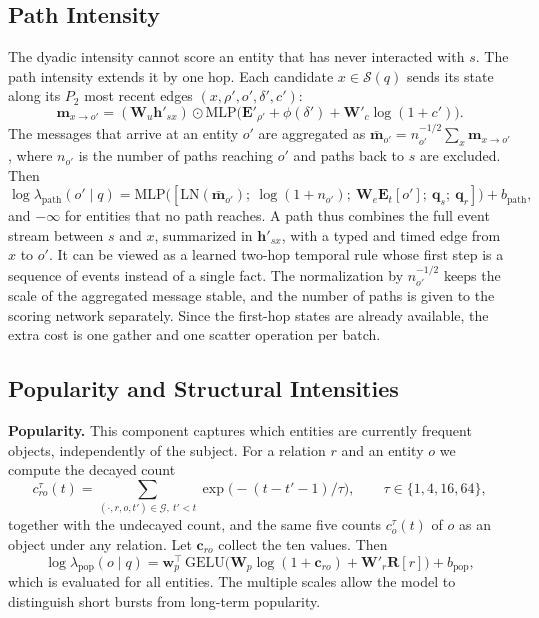 \documentclass[runningheads]{llncs}
\newcommand{\lam}{\lambda}
\newcommand{\para}[1]{\smallskip\noindent\textbf{#1}}
\begin{document}
\subsection{Path Intensity}
\label{sec:path}

The dyadic intensity cannot score an entity that has never interacted with $s$. The path intensity extends it by one hop. Each candidate $x \in \mathcal{S}(q)$ sends its state along its $P_2$ most recent edges $(x, \rho', o', \delta', c')$:
\begin{equation}
  \mathbf{m}_{x \to o'} = (\mathbf{W}_u \mathbf{h}'_{sx}) \odot \mathrm{MLP}\big(\mathbf{E}'_{\rho'} + \phi(\delta') + \mathbf{W}'_c \log(1+c')\big).
\end{equation}
The messages that arrive at an entity $o'$ are aggregated as $\bar{\mathbf{m}}_{o'} = n_{o'}^{-1/2} \sum_x \mathbf{m}_{x \to o'}$, where $n_{o'}$ is the number of paths reaching $o'$ and paths back to $s$ are excluded. Then
\begin{equation}
  \log\lam_{\mathrm{path}}(o' \mid q) = \mathrm{MLP}\big([\mathrm{LN}(\bar{\mathbf{m}}_{o'});\ \log(1+n_{o'});\ \mathbf{W}_e \mathbf{E}_t[o'];\ \mathbf{q}_s;\ \mathbf{q}_r]\big) + b_{\mathrm{path}},
\end{equation}
and $-\infty$ for entities that no path reaches. A path thus combines the full event stream between $s$ and $x$, summarized in $\mathbf{h}'_{sx}$, with a typed and timed edge from $x$ to $o'$. It can be viewed as a learned two-hop temporal rule whose first step is a sequence of events instead of a single fact. The normalization by $n_{o'}^{-1/2}$ keeps the scale of the aggregated message stable, and the number of paths is given to the scoring network separately. Since the first-hop states are already available, the extra cost is one gather and one scatter operation per batch.

\subsection{Popularity and Structural Intensities}
\label{sec:struct}

\para{Popularity.} This component captures which entities are currently frequent objects, independently of the subject. For a relation $r$ and an entity $o$ we compute the decayed count
\begin{equation}
  c^{\tau}_{ro}(t) = \sum_{(\cdot, r, o, t') \in \mathcal{G},\ t' < t} \exp\!\big(-(t - t' - 1)/\tau\big), \qquad \tau \in \{1, 4, 16, 64\},
\end{equation}
together with the undecayed count, and the same five counts $c^{\tau}_{o}(t)$ of $o$ as an object under any relation. Let $\mathbf{c}_{ro}$ collect the ten values. Then
\begin{equation}
  \log\lam_{\mathrm{pop}}(o \mid q) = \mathbf{w}_p^\top\, \mathrm{GELU}\big(\mathbf{W}_p \log(1 + \mathbf{c}_{ro}) + \mathbf{W}'_r \mathbf{R}[r]\big) + b_{\mathrm{pop}} ,
\end{equation}
which is evaluated for all entities. The multiple scales allow the model to distinguish short bursts from long-term popularity.
\end{document}
